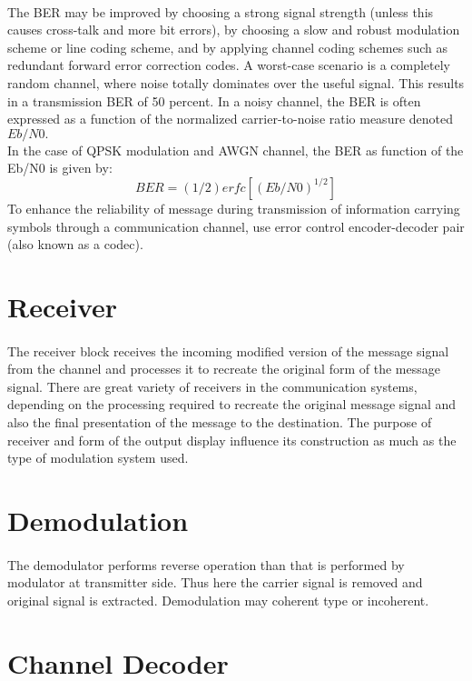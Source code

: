 \documentclass[14pt]{report}
\begin{document}
{\paragraph{} The BER may be improved by choosing a strong signal strength (unless this causes cross-talk and more bit errors), by choosing a slow and robust modulation scheme or line coding scheme, and by applying channel coding schemes such as redundant forward error correction codes.
A worst-case scenario is a completely random channel, where noise totally dominates over the useful signal. This results in a transmission BER of 50 percent. In a noisy channel, the BER is often expressed as a function of the normalized carrier-to-noise ratio measure denoted $Eb/N0.$\\
In the case of QPSK modulation and AWGN channel, the BER as function of the Eb/N0 is given by:\\
$$BER=(1/2)erfc[(Eb/N0)^{1/2}]$$
To enhance the reliability of message during transmission of information carrying symbols through a communication channel, use error control encoder-decoder pair (also known as a codec).
\section{Receiver}
\paragraph{} The receiver block receives the incoming modified version of the message signal from the channel and processes it to recreate the original form of the message signal. There are great variety of receivers in the communication systems, depending on the processing required to recreate the original message signal and also the final presentation of the message to the destination. The purpose of receiver and form of the output display influence its construction as much as the type of modulation system used.
\section{Demodulation}
\paragraph{} The demodulator performs reverse operation than that is performed by modulator at transmitter side. Thus here the carrier signal is removed and original signal is extracted. Demodulation may coherent type or incoherent. 
\section{Channel Decoder}
}
\end{document}
